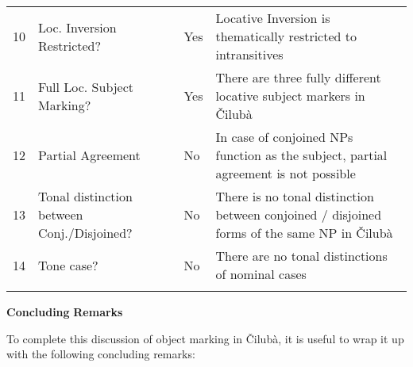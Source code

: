 \documentclass[output=paper]{langscibook}
\begin{document}
\begin{tabularx}{\textwidth}{XXXX}
10 & Loc. Inversion Restricted? & Yes & Locative Inversion is thematically restricted to intransitives\\
11 & Full Loc. Subject Marking? & Yes & There are three fully different locative subject markers in Čilubà\\
12 & Partial Agreement & No & In case of conjoined NPs function as the subject, partial agreement is not possible\\
13 & Tonal distinction between Conj./Disjoined? & No & There is no tonal distinction between conjoined / disjoined forms of the same NP in Čilubà\\
14 & Tone case? & No & There are no tonal distinctions of nominal cases\\
\lspbottomrule
\end{tabularx}
\textbf{Concluding} \textbf{Remarks}

To complete this discussion of object marking in Čilubà, it is useful to wrap it up with the following concluding remarks:
\end{document}
